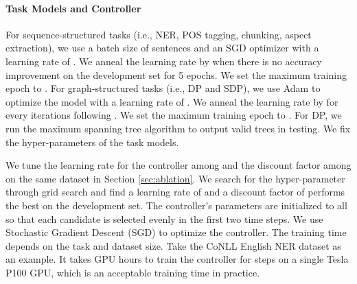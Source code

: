 \documentclass[11pt,a4paper]{article}
\begin{document}
\paragraph{Task Models and Controller}
\label{sec:models}
For sequence-structured tasks (i.e., NER, POS tagging, chunking, aspect extraction), we use a batch size of  sentences and an SGD optimizer with a learning rate of . We anneal the learning rate by  when there is no accuracy improvement on the development set for 5 epochs. We set the maximum training epoch to . For graph-structured tasks (i.e., DP and SDP), we use Adam \citep{kingma2014adam} to optimize the model with a learning rate of . We anneal the learning rate by  for every  iterations following \citet{dozat2016deep}. We set the maximum training epoch to . For DP, we run the maximum spanning tree \cite{mcdonald-etal-2005-non} algorithm to output valid trees in testing. We fix the hyper-parameters of the task models. 

We tune the learning rate for the controller among  and the discount factor among  on the same dataset in Section \ref{sec:ablation}. We search for the hyper-parameter through grid search and find a learning rate of  and a discount factor of  performs the best on the development set. The controller's parameters are initialized to all  so that each candidate is selected evenly in the first two time steps. 
We use Stochastic Gradient Descent (SGD) to optimize the controller. 
The training time depends on the task and dataset size. Take the CoNLL English NER dataset as an example. It takes  GPU hours to train the controller for  steps on a single Tesla P100 GPU, which is an acceptable training time in practice.
\end{document}
